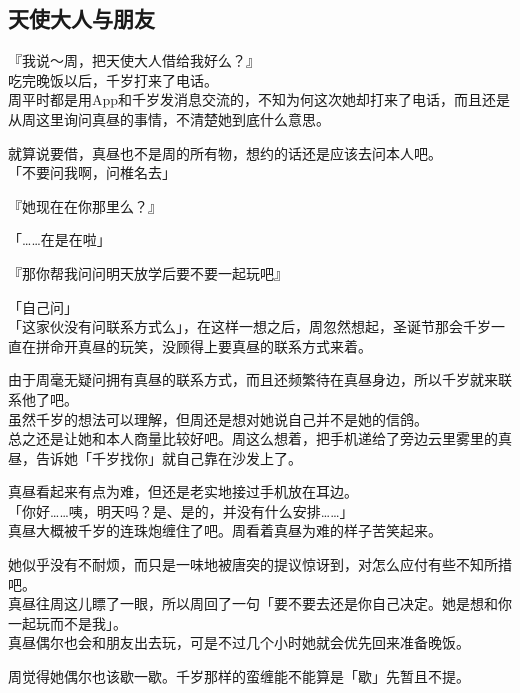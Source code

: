 \subsection{天使大人与朋友}

『我说～周，把天使大人借给我好么？』\\

吃完晚饭以后，千岁打来了电话。\\

周平时都是用App和千岁发消息交流的，不知为何这次她却打来了电话，而且还是从周这里询问真昼的事情，不清楚她到底什么意思。

就算说要借，真昼也不是周的所有物，想约的话还是应该去问本人吧。\\

「不要问我啊，问椎名去」

『她现在在你那里么？』

「……在是在啦」

『那你帮我问问明天放学后要不要一起玩吧』

「自己问」\\

「这家伙没有问联系方式么」，在这样一想之后，周忽然想起，圣诞节那会千岁一直在拼命开真昼的玩笑，没顾得上要真昼的联系方式来着。

由于周毫无疑问拥有真昼的联系方式，而且还频繁待在真昼身边，所以千岁就来联系他了吧。\\

虽然千岁的想法可以理解，但周还是想对她说自己并不是她的信鸽。\\

总之还是让她和本人商量比较好吧。周这么想着，把手机递给了旁边云里雾里的真昼，告诉她「千岁找你」就自己靠在沙发上了。

真昼看起来有点为难，但还是老实地接过手机放在耳边。\\

「你好……咦，明天吗？是、是的，并没有什么安排……」\\

真昼大概被千岁的连珠炮缠住了吧。周看着真昼为难的样子苦笑起来。

她似乎没有不耐烦，而只是一味地被唐突的提议惊讶到，对怎么应付有些不知所措吧。\\

真昼往周这儿瞟了一眼，所以周回了一句「要不要去还是你自己决定。她是想和你一起玩而不是我」。\\

真昼偶尔也会和朋友出去玩，可是不过几个小时她就会优先回来准备晚饭。

周觉得她偶尔也该歇一歇。千岁那样的蛮缠能不能算是「歇」先暂且不提。\\

